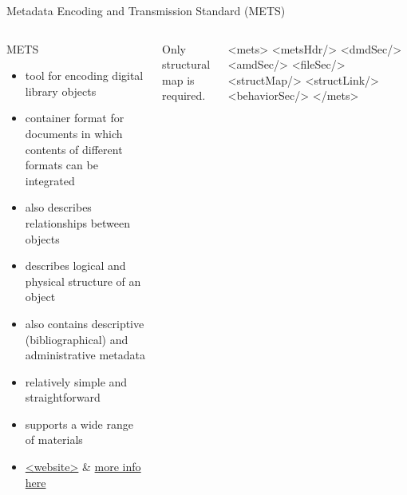 

\begin{frame}[fragile]{Metadata Encoding and Transmission Standard (METS)}
\begin{columns}
\begin{block}{METS}\footnotesize
\begin{itemize}
\item tool for encoding digital library objects
\item container format for documents in which contents of different formats can be integrated 
\item also describes relationships between objects
\item describes logical and physical structure of an object
\item also contains descriptive (bibliographical) and administrative metadata
\item relatively simple and straightforward
\item supports a wide range of materials 
\item \href{https://www.loc.gov/standards/mets/mets-present.html}{<website>} \& \href{https://www.loc.gov/standards/mets/presentations/METS.ppt}{more info here}
\end{itemize}
\end{block}
Only structural map is required.
\begin{xmlcode}
<mets>
  <metsHdr/>
  <dmdSec/>
  <amdSec/>
  <fileSec/>
  <structMap/>
  <structLink/>
  <behaviorSec/>
</mets>
\end{xmlcode}
\end{columns}
\end{frame}


